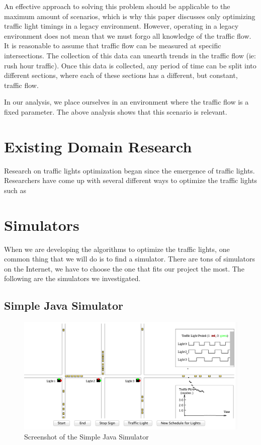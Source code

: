 \documentclass{article} %
\begin{document}
An effective approach to solving this problem should be applicable to the maximum amount of scenarios, which is why this paper discusses only optimizing traffic light timings in a legacy environment.
However, operating in a legacy environment does not mean that we must forgo all knowledge of the traffic flow. It is reasonable to assume that traffic flow can be measured at specific intersections. The collection of this data can unearth trends in the traffic flow (ie: rush hour traffic). Once this data is collected, any period of time can be split into different sections, where each of these sections has a different, but constant, traffic flow.


In our analysis, we place ourselves in an environment where the traffic flow is a fixed parameter. The above analysis shows that this scenario is relevant.

\section{Existing Domain Research}
Research on traffic lights optimization began since the emergence of traffic lights. Researchers have come up with several different ways to optimize the traffic lights such as 

\section{Simulators}
\label{gen_inst}

When we are developing the algorithms to optimize the traffic lights, one common thing that we will do is to find a simulator. There are tons of simulators on the Internet, we have to choose the one that fits our project the most. The following are the simulators we investigated.
\subsection{Simple Java Simulator}
\begin{figure}
\caption{Screenshot of the Simple Java Simulator}
 \includegraphics[width=\textwidth]{images/simulator/SimpleJavaSimulator.png} 
\end{figure}
\end{document}
